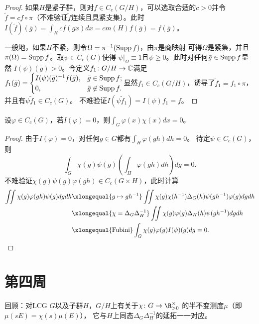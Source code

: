 \begin{proof}
    如果$H$是紧子群，则对$f \in C_c(G/H)$，可以选取合适的$c>0$并令
    $\tilde{f} = cf \circ \pi$（不难验证$\tilde{f}$连续且具紧支集）。此时$\displaystyle I(\tilde{f})(\bar{g}) = \int_H cf(\overline{gx}) dx = cm(H)f(\bar{g}) = f(\bar{g})$。

    一般地，如果$H$不紧，则令$\Omega = \pi^{-1}(\operatorname{Supp} f)$，由$\pi$是商映射
    可得$\Omega$是紧集，并且$\pi(\Omega) = \operatorname{Supp} f$。取$\psi \in C_c(G)$使得
    $\psi|_\Omega \equiv 1$且$\psi \geqslant 0$。此时对任何$\bar{g} \in \operatorname{Supp} f$显然
    $I(\psi)(\bar{g}) > 0$。今定义$f_1 \colon G/H \to \mathbb{C}$满足$f_1(\bar{g}) = \begin{cases}
        I(\psi)(\bar{g})^{-1}f(\bar{g}), & \bar{g} \in \operatorname{Supp} f; \\ 0, & \bar{g} \not\in \operatorname{Supp} f.
    \end{cases}$显然$f_1 \in C_c(G/H)$，诱导了$\tilde{f}_1 = f_1 \circ \pi$，并且有$\psi\tilde{f}_1 \in C_c(G)$。
    不难验证$I(\psi \tilde{f}_1) = I(\psi)f_1 = f$。
\end{proof}
\begin{lemma}
    设$\varphi \in C_c(G)$，若$I(\varphi) = 0$，则$\displaystyle \int_G \varphi(x)\chi(x) dx = 0$。
\end{lemma}
\begin{proof}
    由于$I(\varphi) = 0$，对任何$g \in G$都有$\displaystyle \int_H \varphi(gh) dh = 0$。
    待定$\psi \in C_c(G)$，则\[\int_G \chi(g)\psi(g)\left( \int_H\varphi(gh)dh \right)dg = 0.\]
    不难验证$\chi(g)\psi(g)\varphi(gh) \in C_c(G \times H)$，此时计算
    \begin{align*}
        \iint \chi(g)\varphi(gh)\psi(g) dgdh 
        & \xlongequal{g \mapsto gh^{-1}} \iint \chi(g)\chi(h^{-1})\Delta_G(h)\psi(gh^{-1})\varphi(g)dgdh
        \\ & \xlongequal{\chi = \Delta_G\Delta_H^{-1}} \iint \chi(g)\varphi(g)\Delta_H(h)\psi(gh^{-1})dgdh
        \\ & \xlongequal{\text{Fubini}} \int_G \chi(g)\varphi(g)I(\psi)(g) dg = 0.
    \end{align*}
\end{proof}
\section{第四周}
回顾：对LCG $G$以及子群$H$，$G/H$上有关于$\chi \colon G \to \R_{>0}^\times$
的半不变测度$\mu$（即$\mu(sE) = \chi(s)\mu(E)$），
它与$H$上同态$\Delta_G\Delta_H^{-1}$的延拓一一对应。

